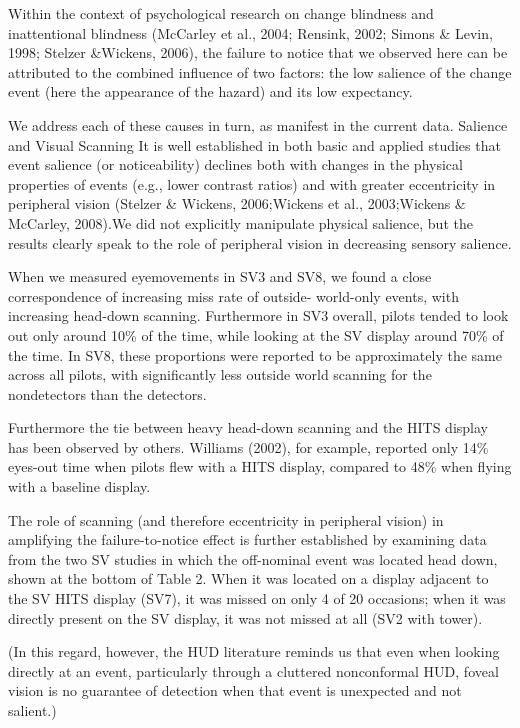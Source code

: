 \documentclass[utf8,bachelor,manualbib]{gradu3}
\begin{document}
Within the context of psychological research on change blindness and inattentional blindness (McCarley et al., 2004; Rensink, 2002; Simons \& Levin, 1998; Stelzer \&Wickens, 2006), the failure to notice that we observed here can be attributed to the combined influence of two factors: the low salience of the change event (here the appearance of the hazard) and its low expectancy.

We address each of these causes in turn, as manifest in the current data. Salience and Visual Scanning It is well established in both basic and applied studies that event salience (or noticeability) declines both with changes in the physical properties of events (e.g., lower contrast ratios) and with greater eccentricity in peripheral vision (Stelzer \& Wickens, 2006;Wickens et al., 2003;Wickens \& McCarley, 2008).We did not explicitly manipulate physical salience, but the results clearly speak to the role of peripheral vision in decreasing sensory salience.

When we measured eyemovements in SV3 and SV8, we found a close correspondence of increasing miss rate of outside- world-only events, with increasing head-down scanning. Furthermore in SV3 overall, pilots tended to look out only around 10\% of the time, while looking at the SV display around 70\% of the time. In SV8, these proportions were reported to be approximately the same across all pilots, with significantly less outside world scanning for the nondetectors than the detectors.







Furthermore the tie between heavy head-down scanning and the HITS display has been observed by others. Williams (2002), for example, reported only 14\% eyes-out time when pilots flew with a HITS display, compared to 48\% when flying with a baseline display.

The role of scanning (and therefore eccentricity in peripheral vision) in amplifying the failure-to-notice effect is further established by examining data from the two SV studies in which the off-nominal event was located head down, shown at the bottom of Table 2. When it was located on a display adjacent to the SV HITS display (SV7), it was missed on only 4 of 20 occasions; when it was directly present on the SV display, it was not missed at all (SV2 with tower).

(In this regard, however, the HUD literature reminds us that even when looking directly at an event, particularly through a cluttered nonconformal HUD, foveal vision is no guarantee of detection when that event is unexpected and not salient.)
\end{document}
